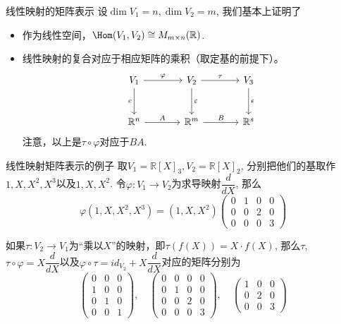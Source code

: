 
\begin{frame}[fragile]

\begin{block}{线性映射的矩阵表示}
设$\dim V_1 = n, \dim V_2 = m$, 我们基本上证明了
\begin{itemize}
\item 作为线性空间，$\Hom(V_1, V_2) \cong M_{m\times n}(\mathbb{R})$.
\item 线性映射的复合对应于相应矩阵的乘积（取定基的前提下）。
\[
\begin{tikzcd}[column sep = large, row sep = large]
V_1 \ar[r, "\varphi"] \ar[d, "e"'] & V_2 \ar[r, "\tau"] \ar[d, "\varepsilon"] & V_3 \ar[d, "\epsilon"] \\
\mathbb{R}^n \ar[r, "A"] & \mathbb{R}^m \ar[r, "B"] & \mathbb{R}^s
\end{tikzcd}
\]
注意，以上是$\tau\circ\varphi$对应于$BA$.
\end{itemize}
\end{block}

\end{frame}


\begin{frame}

\begin{block}{线性映射矩阵表示的例子}
取$V_1 = \mathbb{R}[X]_3, V_2 = \mathbb{R}[X]_2$, 分别把他们的基取作$1,X,X^2,X^3$以及$1,X,X^2$. 令$\varphi: V_1 \to V_2$为求导映射$\dfrac{d}{dX}$, 那么
\[\varphi(1,X,X^2,X^3) = (1,X,X^2) \begin{pmatrix}
0 & 1 & 0 & 0 \\ 0 & 0 & 2 & 0 \\ 0 & 0 & 0 & 3
\end{pmatrix}\]

\pause

如果$\tau: V_2 \to V_1$为``乘以$X$''的映射，即$\tau(f(X)) = X\cdot f(X)$, 那么$\tau$, $\tau\circ\varphi = X\dfrac{d}{dX}$以及$\varphi\circ\tau = id_{V_2} + X\dfrac{d}{dX}$对应的矩阵分别为
\[\begin{pmatrix} 0 & 0 & 0 \\ 1 & 0 & 0 \\ 0 & 1 & 0 \\ 0 & 0 & 1 \end{pmatrix}, \quad \begin{pmatrix}
0 & 0 & 0 & 0 \\ 0 & 1 & 0 & 0 \\ 0 & 0 & 2 & 0 \\ 0 & 0 & 0 & 3 \end{pmatrix}, \quad \begin{pmatrix} 1 & 0 & 0 \\ 0 & 2 & 0 \\ 0 & 0 & 3 \end{pmatrix}\]
\end{block}

\end{frame}

